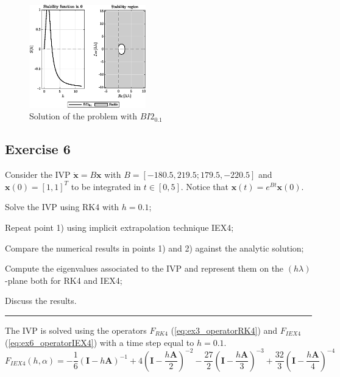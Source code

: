 \documentclass[11pt,a4paper,oneside]{article}
\renewcommand{\vec}[1]{\mathbf{#1}}
\begin{document}
\begin{figure}[htb]
    \centering
    \includegraphics*[width=0.45\textwidth, keepaspectratio]{ex5_BI2_0.1.eps}
    \caption[]{\label{fig:ex5_BI2-01} Solution of the problem with $BI2_{0.1}$}
\end{figure}


\clearpage
\subsection{Exercise 6}

Consider the IVP $\dot{\vec x} = B \vec x$ with $B =[-180.5, 219.5; 179.5, -220.5]$ and $\vec{x}(0)=[1, 1]^T$ to be integrated in $t\in[0, 5]$. Notice that $\vec{x}(t)=e^{Bt}\vec{x}(0)$.
\begin{enumerate*}[label=\arabic*)]
    \item Solve the IVP using RK4 with $h=0.1$;
    \item Repeat point 1) using implicit extrapolation technique IEX4;
    \item Compare the numerical results in points 1) and 2) against the analytic solution;
    \item Compute the eigenvalues associated to the IVP and represent them on the $(h\lambda)$-plane both for RK4 and IEX4;
    \item Discuss the results.
\end{enumerate*}

\medskip \hrule \medskip

The IVP is solved using the operators $F_{RK4}$ (\cref{eq:ex3_operatorRK4}) and $F_{IEX4}$ (\cref{eq:ex6_operatorIEX4}) with a time step equal to $h=0.1$.
\begin{equation}
    F_{IEX4}(h,\alpha) =  -\frac{1}{6} \left(\vec{I} - h\vec{A}\right)^{-1} + 4 \left(\vec{I} - \frac{h\vec{A}}{2}\right)^{-2} -\frac{27}{2} \left(\vec{I} - \frac{h\vec{A}}{3}\right)^{-3} + \frac{32}{3} \left(\vec{I} - \frac{h\vec{A}}{4}\right)^{-4}
    \label{eq:ex6_operatorIEX4}
\end{equation}
\end{document}
